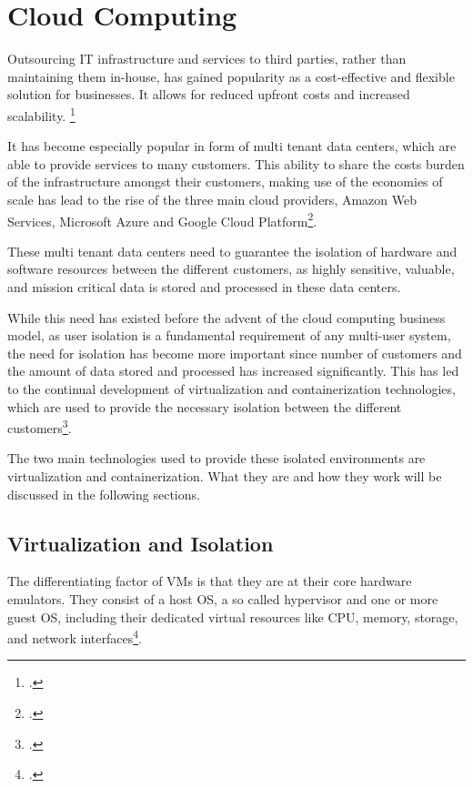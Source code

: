 \section{Cloud Computing}
\label{sec:Cloud_Computing}

Outsourcing IT infrastructure and services to third parties,
rather than maintaining them in-house, has gained popularity as a cost-effective and flexible solution for businesses.
It allows for reduced upfront costs and increased scalability. \footcite{armbrustCloudsBerkeleyView}

It has become especially popular in form of multi tenant data centers, which are able to provide services to many customers.
This ability to share the costs burden of the infrastructure amongst their customers, making use of the economies of scale
has lead to the rise of the three main cloud providers, Amazon Web Services, Microsoft Azure and Google Cloud Platform\footcite{InfographicAmazonMaintains2024}.

These multi tenant data centers need to guarantee the isolation of hardware and software resources between the different customers,
as highly sensitive, valuable, and mission critical data is stored and processed in these data centers.

While this need has existed before the advent of the cloud computing business model,
as user isolation is a fundamental requirement of any multi-user system,
the need for isolation has become more important since number of customers and the amount of data stored and processed has increased significantly.
This has led to the continual development of virtualization and containerization technologies,
which are used to provide the necessary isolation between the different customers\footcite{randalIdealRealRevisiting2021}.

The two main technologies used to provide these isolated environments are virtualization and containerization.
What they are and how they work will be discussed in the following sections.

\subsection{Virtualization and Isolation}
\label{sec:virtualization}

The differentiating factor of \ac{VM}s is that they are at their core hardware emulators.
They consist of a \gls{host} \ac{OS}, a so called hypervisor and one or more \gls{guest} \ac{OS},
including their dedicated virtual resources like \ac{CPU}, memory, storage, and network interfaces\footcite{gotoKernelbasedVirtualMachine2011}.

